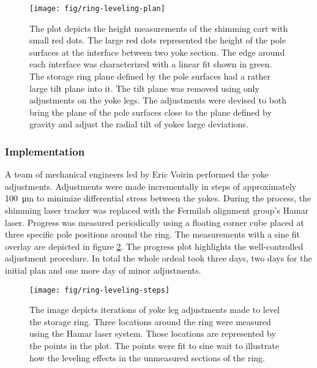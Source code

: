 \begin{figure}
\centering
\texttt{[image: fig/ring-leveling-plan]}
\caption{
    The plot depicts the height measurements of the shimming cart with small red dots.  The large red dots represented the height of the pole surfaces at the interface between two yoke section.  The edge around each interface was characterized with a linear fit shown in green.  The storage ring plane defined by the pole surfaces had a rather large tilt plane into it.  The tilt plane was removed using only adjustments on the yoke legs.  The adjustments were devised to both bring the plane of the pole surfaces close to the plane defined by gravity and adjust the radial tilt of yokes large deviations. 
    \label{fig:ring-leveling-plan}
}
\end{figure}

\subsubsection{Implementation}
A team of mechanical engineers led by Eric Voirin performed the yoke adjustments.  Adjustments were made incrementally in steps of approximately \SI{100}{\micro\meter} to minimize differential stress between the yokes.  During the process, the shimming laser tracker was replaced with the Fermilab alignment group's Hamar laser.  Progress was measured periodically using a floating corner cube placed at three specific pole positions around the ring.  The measurements with a sine fit overlay are depicted in figure \ref{fig:ring-leveling-steps}.  The progress plot highlights the well-controlled adjustment procedure.  In total the whole ordeal took three days, two days for the initial plan and one more day of minor adjustments.

\begin{figure}
\centering
\texttt{[image: fig/ring-leveling-steps]}
\caption{
    The image depicts iterations of yoke leg adjustments made to level the storage ring.  Three locations around the ring were measured using the Hamar laser system.  Those locations are represented by the points in the plot.  The points were fit to sine wait to illustrate how the leveling effects in the unmeasured sections of the ring. 
    \label{fig:ring-leveling-steps}
}
\end{figure}

